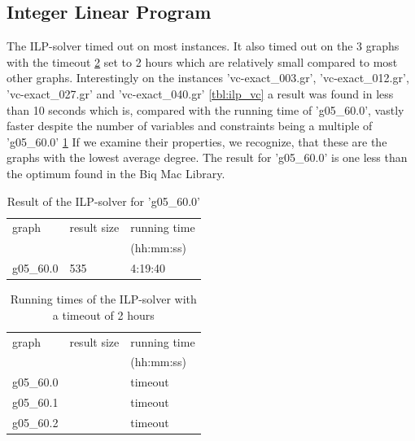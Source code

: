 \documentclass[twocolumn]{article}
\begin{document}
\subsection{Integer Linear Program}
The ILP-solver timed out on most instances. It also timed out on the 3 graphs with the timeout \ref{tbl:ilp_2h}
set to 2 hours which are relatively small compared to most other graphs.
Interestingly on the instances 'vc-exact\_003.gr', 'vc-exact\_012.gr', 'vc-exact\_027.gr' and
'vc-exact\_040.gr' \ref{tbl:ilp_vc} a result was found in less than 10 seconds which is,
compared with the running time of 'g05\_60.0', vastly faster despite the number of variables
and constraints being a multiple of 'g05\_60.0' \ref{tbl:ilp}
If we examine their properties, we recognize, that these are the graphs with the lowest average degree.
The result for 'g05\_60.0' is one less than the optimum found in the Biq Mac Library.

\begin{table}
\begin{tabular}{lll}
  \hline
  graph & result size & running time \\
  &&(hh:mm:ss) \\
  \hline
  g05\_60.0 & 535 & 4:19:40
\end{tabular}
  \caption{Result of the ILP-solver for 'g05\_60.0'}
  \label{tbl:ilp}
  
\end{table}


\begin{table}[!ht]
\begin{tabular}{lll}
  \hline
  graph & result size & running time \\
  &&(hh:mm:ss) \\
  \hline
  g05\_60.0 & & timeout \\
  g05\_60.1 & & timeout \\
  g05\_60.2 & & timeout
\end{tabular}
  \caption{Running times of the ILP-solver with a timeout of 2 hours}
  \label{tbl:ilp_2h}
\end{table}
\end{document}

